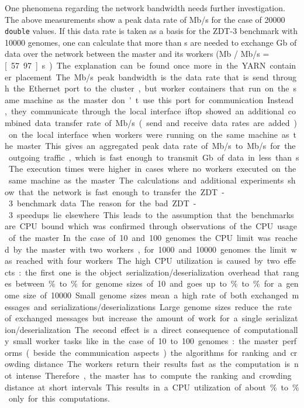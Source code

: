 One phenomena regarding the network bandwidth needs further investigation. The above measurements show a peak data rate of \unit[552]{Mb/s} for the case of 20000 \texttt{double} values. If this data rate is taken as a basis for the ZDT-3 benchmark with 10000 genomes, one can calculate that more than \unit[55]{s} are needed to exchange \unit[32]{Gb} of data over the network between the master and its workers (\unit[32000]{Mb} / \unit[552]{Mb/s} = \unit[57.97]{s}). The explanation can be found once more in the YARN container placement. The \unit[552]{Mb/s} peak bandwidth is the data rate that is send through the Ethernet port to the cluster, but worker containers that run on the same machine as the master don't use this port for communication. Instead, they communicate through the local interface. iftop showed an additional combined data transfer rate of \unit[400]{Mb/s} (send and receive data rates are added) on the local interface when workers were running on the same machine as the master. This gives an aggregated peak data rate of \unit[700]{Mb/s} to \unit[800]{Mb/s} for the outgoing traffic, which is fast enough to transmit \unit[32]{Gb} of data in less than \unit[55]{s}. The execution times were higher in cases where no workers executed on the same machine as the master.

The calculations and additional experiments show that the network is fast enough to transfer the ZDT-3 benchmark data. The reason for the bad ZDT-3 speedups lie elsewhere.

This leads to the assumption that the benchmarks are CPU bound which was confirmed through observations of the CPU usage of the master. In the case of 10 and 100 genomes the CPU limit was reached by the master with two workers, for 1000 and 10000 genomes the limit was reached with four workers.

The high CPU utilization is caused by two effects: the first one is the object serialization/deserialization overhead that ranges between \unit[30]{\%} to \unit[40]{\%} for genome sizes of 10 and goes up to \unit[60]{\%} to \unit[70]{\%} for a genome size of 10000. Small genome sizes mean a high rate of both exchanged messages and serializations/deserializations. Large genome sizes reduce the rate of exchanged messages but increase the amount of work for a single serialization/deserialization.

The second effect is a direct consequence of computationally small worker tasks like in the case of 10 to 100 genomes: the master performs (beside the communication aspects) the algorithms for ranking and crowding distance. The workers return their results fast as the computation is not intense. Therefore, the master has to compute the ranking and crowding distance at short intervals. This results in a CPU utilization of about \unit[25]{\%} to \unit[30]{\%} only for this computations.

